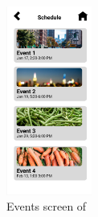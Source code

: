 \documentclass[12pt, titlepage]{article}
\begin{document}
\begin{figure}[H]
\centering
\includegraphics[width=0.25\textwidth]{Events.png}
\caption{Events screen of \progname{}}
\label{FigEvents}
\end{figure}

\end{document}
